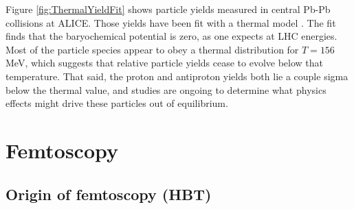 Figure \ref{fig:ThermalYieldFit} shows particle yields measured in central Pb-Pb collisions at ALICE.
Those yields have been fit with a thermal model \cite{Stachel:2013zma}. 
The fit finds that the baryochemical potential is zero, as one expects at LHC energies.
Most of the particle species appear to obey a thermal distribution for $T = 156$ MeV, which suggests that relative particle yields cease to evolve below that temperature.
That said, the proton and antiproton yields both lie a couple sigma below the thermal value, and studies are ongoing to determine what physics effects might drive these particles out of equilibrium.


\section{Femtoscopy}
\label{sec:Femtoscopy}

\subsection{Origin of femtoscopy (HBT)}
\label{sec:OriginAsHBT}

